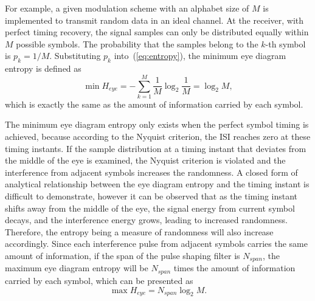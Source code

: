 \documentclass[12pt, draftclsnofoot, onecolumn]{IEEEtran}
\begin{document}
For example, a given modulation scheme with an alphabet size of \(M\) is implemented to transmit random data in an ideal channel. 
At the receiver, with perfect timing recovery, the signal samples can only be distributed equally within \(M\) possible symbols.
The probability that the samples belong to the $k$-th symbol is \(p_k=1/M\).
Substituting \(p_k\) into~(\ref{eq:entropy}), the minimum eye diagram entropy is defined as
\begin{equation}
\min{H_{eye}} =  - \sum\limits_{k = 1}^M {{\frac{1}{M}}\log_2 {\frac{1}{M}}}=\log_2 {M},
\label{eq:entropy_mid}
\end{equation}
which is exactly the same as the amount of information carried by each symbol.


The minimum eye diagram entropy only exists when the perfect symbol timing is achieved, because according to the Nyquist criterion, the ISI reaches zero at these timing instants.
If the sample distribution at a timing instant that deviates from the middle of the eye is examined, 
the Nyquist criterion is violated and the
interference from adjacent symbols increases the randomness.
A closed form of analytical relationship between the eye diagram entropy and the timing instant is difficult to demonstrate, however it can be observed that 
as the timing instant shifts away from the middle of the eye, the signal energy from current symbol decays, and the interference energy grows, leading to increased randomness.
% 
% 
Therefore, the entropy being a measure of randomness will also increase accordingly.
Since each interference pulse from adjacent symbols carries the same amount of information, 
if the span of the pulse shaping filter is \(N_{span}\), 
the maximum eye diagram entropy will be \(N_{span}\) times the amount of information carried by each symbol, which can be presented as
% 
% 
\begin{equation}
\max{H_{eye}} =  N_{span}\log_2 {M}.
\label{eq:entropy_neb}
\end{equation}
\end{document}
